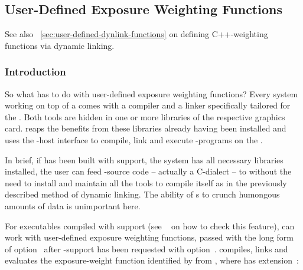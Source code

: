 

\subsection[User-Defined \acronym{OpenCL} Functions]{\label{sec:user-defined-opencl-functions}%
  User-Defined  Exposure Weighting Functions}

See also \sectionName~\ref{sec:user-defined-dynlink-functions} on defining C++-weighting
functions via dynamic linking.


\subsubsection[Introduction]{\label{sec:user-defined-opencl-functions-introduction}%
  Introduction}

%
%
So what has  to do with user-defined exposure weighting functions?  Every
 system working on top of a  comes with a compiler and a linker
specifically tailored for the .  Both tools are hidden in one or more libraries
of the respective graphics card.  \App{} reaps the benefits from these libraries already having
been installed and uses the -host interface to compile, link and execute
-programs on the .

In brief, if \appcmd{} has been built with  support, the system has all
necessary libraries installed, the user can feed -source code -- actually a
C-dialect -- to \App{} without the need to install and maintain all the tools to compile
\appcmd{} itself as in the previously described method of dynamic linking.  The ability of
s to crunch humongous amounts of data is unimportant here.

\smallskip

\noindent{}

%
%
For \App{} executables compiled with  support (see
\sectionName~ on how to check this feature), \App{} can work
with user-defined exposure weighting functions, passed with the long form of
option~ after -support has
been requested with option~.  \App{} compiles, links and evaluates the
exposure-weight function identified by  from , where
 has extension~:


